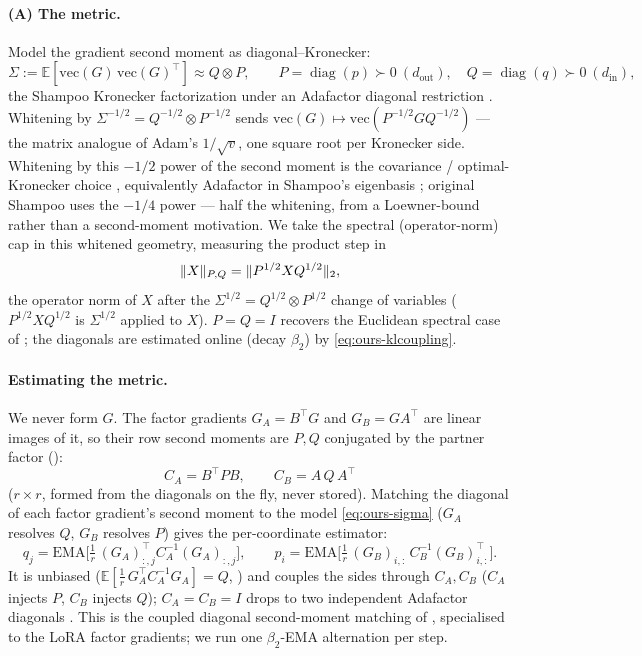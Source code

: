 \documentclass[11pt]{article}
\newcommand{\E}{\mathbb{E}}
\DeclareMathOperator{\diag}{diag}
\DeclarePairedDelimiter{\norm}{\lVert}{\rVert}
\theoremstyle{plain}
\theoremstyle{definition}
\theoremstyle{remark}
\begin{document}
\paragraph{(A) The metric.} Model the gradient second moment as diagonal--Kronecker:
\begin{equation}
  \Sigma:=\E[\mathrm{vec}(G)\,\mathrm{vec}(G)^\top]\approx Q\otimes P,\qquad
  P=\diag(p)\succ0\ (d_{\mathrm{out}}),\quad Q=\diag(q)\succ0\ (d_{\mathrm{in}}),
  \label{eq:ours-sigma}
\end{equation}
the Shampoo Kronecker factorization \cite{soap} under an Adafactor diagonal restriction \cite{adafactor}. Whitening by $\Sigma^{-1/2}=Q^{-1/2}\otimes P^{-1/2}$ sends $\mathrm{vec}(G)\mapsto\mathrm{vec}(P^{-1/2}GQ^{-1/2})$ --- the matrix analogue of Adam's $1/\!\sqrt{v}$, one square root per Kronecker side. Whitening by this $-1/2$ power of the second moment is the covariance / optimal-Kronecker choice \cite{morwani,klshampoo}, equivalently Adafactor in Shampoo's eigenbasis \cite{soap}; original Shampoo uses the $-1/4$ power \cite{shampoo} --- half the whitening, from a Loewner-bound rather than a second-moment motivation. We take the spectral (operator-norm) cap in this whitened geometry, measuring the product step in
\begin{equation}
  \norm{X}_{P,Q}=\norm{P^{1/2}XQ^{1/2}}_2,
  \label{eq:ours-metric}
\end{equation}
the operator norm of $X$ after the $\Sigma^{1/2}=Q^{1/2}\otimes P^{1/2}$ change of variables ($P^{1/2}XQ^{1/2}$ is $\Sigma^{1/2}$ applied to $X$). $P=Q=I$ recovers the Euclidean spectral case of ; the diagonals are estimated online (decay $\beta_2$) by \eqref{eq:ours-klcoupling}.

\paragraph{Estimating the metric.}
\label{par:coupling}
We never form $G$. The factor gradients $G_A=B^\top G$ and $G_B=GA^\top$ are linear images of it, so their row second moments are $P,Q$ conjugated by the partner factor ():
\begin{equation}
  C_A=B^\top P B,\qquad C_B=A\,Q\,A^\top
  \label{eq:ours-closure}
\end{equation}
($r\times r$, formed from the diagonals on the fly, never stored). Matching the diagonal of each factor gradient's second moment to the model \eqref{eq:ours-sigma} ($G_A$ resolves $Q$, $G_B$ resolves $P$) gives the per-coordinate estimator:
\begin{equation}
  q_j=\mathrm{EMA}\Big[\tfrac1r\,(G_A)_{:,j}^\top C_A^{-1}(G_A)_{:,j}\Big],\qquad
  p_i=\mathrm{EMA}\Big[\tfrac1r\,(G_B)_{i,:}\,C_B^{-1}(G_B)_{i,:}^\top\Big].
  \label{eq:ours-klcoupling}
\end{equation}
It is unbiased ($\E[\tfrac1r\,G_A^\top C_A^{-1}G_A]=Q$, ) and couples the sides through $C_A,C_B$ ($C_A$ injects $P$, $C_B$ injects $Q$); $C_A=C_B=I$ drops to two independent Adafactor diagonals \cite{adafactor}. This is the coupled diagonal second-moment matching of \cite{klshampoo}, specialised to the LoRA factor gradients; we run one $\beta_2$-EMA alternation per step.
\end{document}
